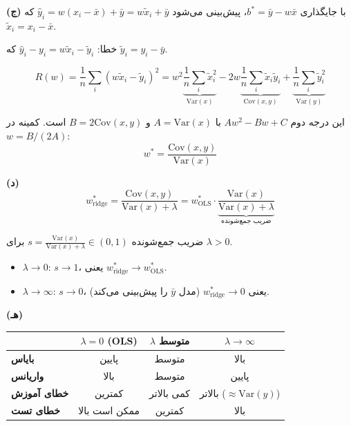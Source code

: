 \documentclass[12pt,a4paper]{article}
\begin{document}
\bigskip

\textbf{(ج)} با جایگذاری $b^* = \bar{y} - w\bar{x}$، پیش‌بینی می‌شود $\hat{y}_i = w(x_i - \bar{x}) + \bar{y} = w\tilde{x}_i + \bar{y}$ که $\tilde{x}_i = x_i - \bar{x}$.

خطا: $\hat{y}_i - y_i = w\tilde{x}_i - \tilde{y}_i$ که $\tilde{y}_i = y_i - \bar{y}$.

$$R(w) = \frac{1}{n}\sum_i (w\tilde{x}_i - \tilde{y}_i)^2 = w^2 \underbrace{\frac{1}{n}\sum_i \tilde{x}_i^2}_{\text{Var}(x)} - 2w \underbrace{\frac{1}{n}\sum_i \tilde{x}_i\tilde{y}_i}_{\text{Cov}(x,y)} + \underbrace{\frac{1}{n}\sum_i \tilde{y}_i^2}_{\text{Var}(y)}$$

این درجه دوم $Aw^2 - Bw + C$ با $A = \text{Var}(x)$ و $B = 2\text{Cov}(x,y)$ است. کمینه در $w = B/(2A)$:
$$w^* = \frac{\text{Cov}(x,y)}{\text{Var}(x)}$$

\bigskip

\textbf{(د)}
$$w^*_{\text{ridge}} = \frac{\text{Cov}(x,y)}{\text{Var}(x) + \lambda} = w^*_{\text{OLS}} \cdot \underbrace{\frac{\text{Var}(x)}{\text{Var}(x) + \lambda}}_{\text{ضریب جمع‌شونده}}$$

ضریب جمع‌شونده $s = \frac{\text{Var}(x)}{\text{Var}(x) + \lambda} \in (0,1)$ برای $\lambda > 0$.

\begin{itemize}
\item $\lambda \to 0$: $s \to 1$، یعنی $w^*_{\text{ridge}} \to w^*_{\text{OLS}}$.
\item $\lambda \to \infty$: $s \to 0$، یعنی $w^*_{\text{ridge}} \to 0$ (مدل $\bar{y}$ را پیش‌بینی می‌کند).
\end{itemize}

\bigskip

\textbf{(هـ)}

\begin{center}
\begin{tabular}{|l|c|c|c|}
\hline
 & $\lambda = 0$ (OLS) & $\lambda$ متوسط & $\lambda \to \infty$ \\
\hline
\textbf{بایاس} & پایین & متوسط & بالا \\
\hline
\textbf{واریانس} & بالا & متوسط & پایین \\
\hline
\textbf{خطای آموزش} & کمترین & کمی بالاتر & بالاتر ($\approx \text{Var}(y)$) \\
\hline
\textbf{خطای تست} & ممکن است بالا & کمترین & بالا \\
\hline
\end{tabular}
\end{center}
\end{document}
